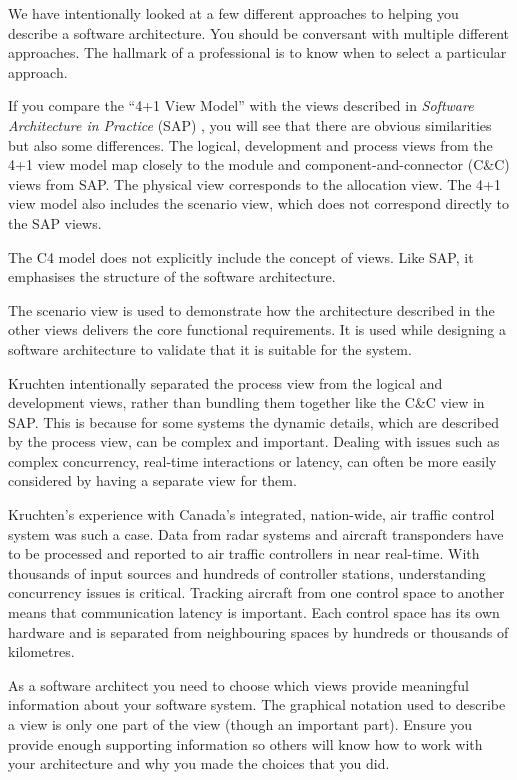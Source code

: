 We have intentionally looked at a few different approaches to helping you describe a software architecture.
You should be conversant with multiple different approaches.
The hallmark of a professional is to know when to select a particular approach.

If you compare the ``4+1 View Model'' \cite{4+1-model} with the views described in \textit{Software Architecture in Practice} (SAP) \cite{bass2021software},
you will see that there are obvious similarities but also some differences.
The logical, development and process views from the 4+1 view model map closely to the module and component-and-connector (C\&C) views from SAP.
The physical view corresponds to the allocation view.
The 4+1 view model also includes the scenario view, which does not correspond directly to the SAP views.

The C4 model does not explicitly include the concept of views.
Like SAP, it emphasises the structure of the software architecture.

The scenario view is used to demonstrate how the architecture described in the other views delivers the core functional requirements.
It is used while designing a software architecture to validate that it is suitable for the system.

Kruchten intentionally separated the process view from the logical and development views,
rather than bundling them together like the C\&C view in SAP.
This is because for some systems the dynamic details, which are described by the process view, can be complex and important.
Dealing with issues such as complex concurrency, real-time interactions or latency, can often be more easily considered by having a separate view for them.

Kruchten's experience with Canada's integrated, nation-wide, air traffic control system was such a case.
Data from radar systems and aircraft transponders have to be processed and reported to air traffic controllers in near real-time.
With thousands of input sources and hundreds of controller stations, understanding concurrency issues is critical.
Tracking aircraft from one control space to another means that communication latency is important.
Each control space has its own hardware and is separated from neighbouring spaces by hundreds or thousands of kilometres.

As a software architect you need to choose which views provide meaningful information about your software system.
The graphical notation used to describe a view is only one part of the view (though an important part).
Ensure you provide enough supporting information so others will know how to work with your architecture and why you made the choices that you did.